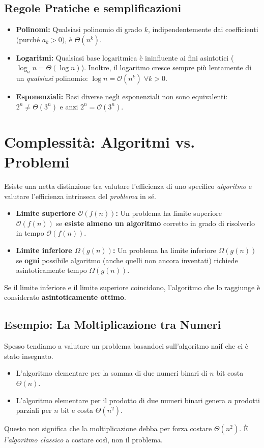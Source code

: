 \documentclass[12pt, a4paper]{article}
\begin{document}
\subsection{Regole Pratiche e semplificazioni}
\begin{itemize}
\item \textbf{Polinomi:} Qualsiasi polinomio di grado $k$, indipendentemente dai coefficienti (purché $a_k > 0$), è \textbf{$\Theta(n^k)$}.
\item \textbf{Logaritmi:} Qualsiasi base logaritmica è ininfluente ai fini asintotici ($\log_a n = \Theta(\log n)$). Inoltre, il logaritmo cresce sempre più lentamente di un \textit{qualsiasi} polinomio: $\log n = \mathcal{O}(n^k) \;\forall k > 0$.
\item \textbf{Esponenziali:} Basi diverse negli esponenziali non sono equivalenti: $2^n \neq \Theta(3^n)$ e anzi $2^n = \mathcal{O}(3^n)$.
\end{itemize}




\section{Complessità: Algoritmi vs. Problemi}

Esiste una netta distinzione tra valutare l'efficienza di uno specifico \textit{algoritmo} e valutare l'efficienza intrinseca del \textit{problema} in sé.

\begin{tcolorbox}[colback=lightergray!10, colframe=tocsec, title=\textbf{Complessità di un Problema Computazionale}]
\begin{itemize}
\item \textbf{Limite superiore $\mathcal{O}(f(n))$:} Un problema ha limite superiore $\mathcal{O}(f(n))$ se \textbf{esiste almeno un algoritmo} corretto in grado di risolverlo in tempo $\mathcal{O}(f(n))$.
\item \textbf{Limite inferiore $\Omega(g(n))$:} Un problema ha limite inferiore $\Omega(g(n))$ se \textbf{ogni} possibile algoritmo (anche quelli non ancora inventati) richiede asintoticamente tempo $\Omega(g(n))$.
\end{itemize}
Se il limite inferiore e il limite superiore coincidono, l'algoritmo che lo raggiunge è considerato \textbf{asintoticamente ottimo}.
\end{tcolorbox}

\subsection{Esempio: La Moltiplicazione tra Numeri}
Spesso tendiamo a valutare un problema basandoci sull'algoritmo naif che ci è stato insegnato.
\begin{itemize}
\item L'algoritmo elementare per la somma di due numeri binari di $n$ bit costa $\Theta(n)$.
\item L'algoritmo elementare per il prodotto di due numeri binari genera $n$ prodotti parziali per $n$ bit e costa $\Theta(n^2)$.
\end{itemize}
Questo non significa che la moltiplicazione debba per forza costare $\Theta(n^2)$. È \textit{l'algoritmo classico} a costare così, non il problema.
\end{document}
